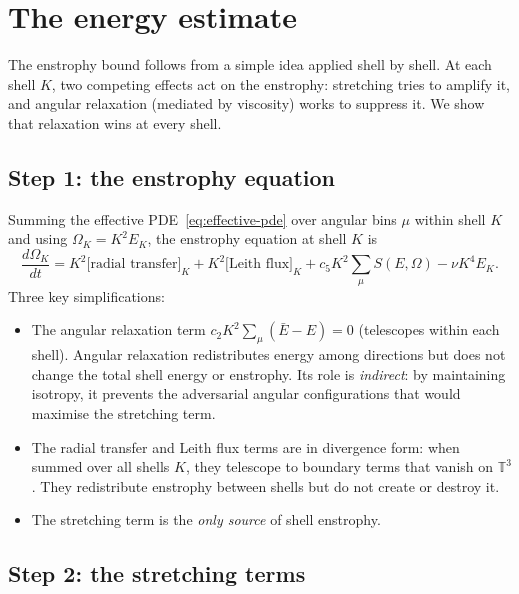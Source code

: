 \documentclass[11pt,a4paper]{article}
\theoremstyle{remark}
\newcommand{\T}{\mathbb{T}}
\begin{document}
\section{The energy estimate}\label{sec:energy-estimate}

The enstrophy bound follows from a simple idea applied shell by shell.  At each shell $K$, two competing effects act on the enstrophy: stretching tries to amplify it, and angular relaxation (mediated by viscosity) works to suppress it.  We show that relaxation wins at every shell.

\subsection{Step 1: the enstrophy equation}

Summing the effective PDE~\eqref{eq:effective-pde} over angular bins $\mu$ within shell $K$ and using $\Omega_K = K^2 E_K$, the enstrophy equation at shell $K$ is
\begin{equation}\label{eq:shell-enstrophy}
  \frac{d\Omega_K}{dt} = K^2 \bigl[\text{radial transfer}\bigr]_K + K^2 \bigl[\text{Leith flux}\bigr]_K + c_5 K^2 \sum_\mu S(E,\Omega) - \nu K^4 E_K.
\end{equation}
Three key simplifications:
\begin{itemize}
\item The angular relaxation term $c_2 K^2 \sum_\mu (\bar{E} - E) = 0$ (telescopes within each shell).  Angular relaxation redistributes energy among directions but does not change the total shell energy or enstrophy.  Its role is \emph{indirect}: by maintaining isotropy, it prevents the adversarial angular configurations that would maximise the stretching term.
\item The radial transfer and Leith flux terms are in divergence form: when summed over all shells $K$, they telescope to boundary terms that vanish on $\T^3$.  They redistribute enstrophy between shells but do not create or destroy it.
\item The stretching term is the \emph{only source} of shell enstrophy.
\end{itemize}

\subsection{Step 2: the stretching terms}
\end{document}
